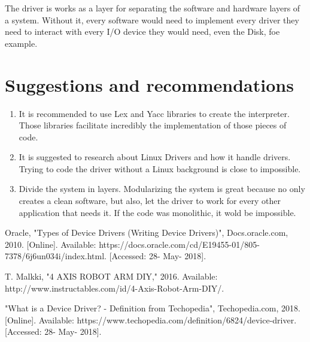 \documentclass[12pt]{article}
\begin{document}
The driver is works as a layer for separating the software and hardware layers of a system. Without it, every software would need to implement every driver they need to interact with every I/O device they would need, even the Disk, foe example.


\section{Suggestions and recommendations}
\begin{enumerate}
\item It is recommended to use Lex and Yacc libraries to create the interpreter. Those libraries facilitate incredibly the implementation of those pieces of code.
\item It is suggested to research about Linux Drivers and how it handle drivers. Trying to code the driver without a Linux background is close to impossible.
\item Divide the system in layers. Modularizing the system is great because no only creates a clean software, but also, let the driver to work for every other application that needs it. If the code was monolithic, it wold be impossible.
\end{enumerate}

\begin{thebibliography}{9}

Oracle, "Types of Device Drivers (Writing Device Drivers)", Docs.oracle.com, 2010. [Online]. Available: https://docs.oracle.com/cd/E19455-01/805-7378/6j6un034i/index.html. [Accessed: 28- May- 2018].

T. Malkki, "4 AXIS ROBOT ARM DIY," 2016. Available: http://www.instructables.com/id/4-Axis-Robot-Arm-DIY/.

"What is a Device Driver? - Definition from Techopedia", Techopedia.com, 2018. [Online]. Available: https://www.techopedia.com/definition/6824/device-driver. [Accessed: 28- May- 2018].



\end{thebibliography}
\end{document}

